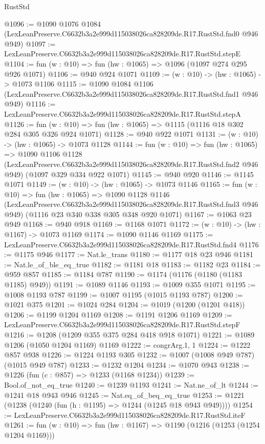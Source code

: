 \begin{lexlean}{RustStd}
\begin{coremodule}
@1096 := @1090
    @1076
    @1084
    (LexLeanPreserve.C6632b3a2e999d115038026ca828209de.R17.RustStd.fnd0 @946 @949)
@1097 := LexLeanPreserve.C6632b3a2e999d115038026ca828209de.R17.RustStd.stepE
@1104 := fun (w : @10) => fun (hw : @1065) => @1096 (@1097 @274 @295 @926 @1071)
@1106 := @940 @924 @1071
@1109 := (w : @10) -> (hw : @1065) -> @1073 @1106
@1115 := @1090
    @1084
    @1106
    (LexLeanPreserve.C6632b3a2e999d115038026ca828209de.R17.RustStd.fnd1 @946 @949)
@1116 := LexLeanPreserve.C6632b3a2e999d115038026ca828209de.R17.RustStd.stepA
@1126 := fun (w : @10) => fun (hw : @1065) => @1115 (@1116 @18 @302 @284 @305 @326 @924 @1071)
@1128 := @940 @922 @1071
@1131 := (w : @10) -> (hw : @1065) -> @1073 @1128
@1144 := fun (w : @10) =>
  fun (hw : @1065) =>
  @1090
    @1106
    @1128
    (LexLeanPreserve.C6632b3a2e999d115038026ca828209de.R17.RustStd.fnd2 @946 @949)
    (@1097 @329 @334 @922 @1071)
@1145 := @940 @920
@1146 := @1145 @1071
@1149 := (w : @10) -> (hw : @1065) -> @1073 @1146
@1165 := fun (w : @10) =>
  fun (hw : @1065) =>
  @1090
    @1128
    @1146
    (LexLeanPreserve.C6632b3a2e999d115038026ca828209de.R17.RustStd.fnd3 @946 @949)
    (@1116 @23 @340 @338 @305 @348 @920 @1071)
@1167 := @1063 @23 @949
@1168 := @940 @918
@1169 := @1168 @1071
@1172 := (w : @10) -> (hw : @1167) -> @1073 @1169
@1174 := @1090 @1146 @1169
@1175 := LexLeanPreserve.C6632b3a2e999d115038026ca828209de.R17.RustStd.fnd4
@1176 := @1175 @946
@1177 := Nat.le_trans
@1180 := @1177 @18 @23 @946
@1181 := Nat.le_of_ble_eq_true
@1182 := @1181 @18
@1183 := @1182 @23
@1184 := @959 @857
@1185 := @1184 @787
@1190 := @1174 (@1176 (@1180 (@1183 @1185) @949))
@1191 := @1089 @1146
@1193 := @1009 @355 @1071
@1195 := @1008 @1193 @787
@1199 := @1007 @1195 (@1015 @1193 @787)
@1200 := @1021 @375
@1201 := @1024 @284
@1204 := @1019 (@1200 (@1201 @418))
@1206 := @1199 @1204 @1169
@1208 := @1191 @1206 @1169
@1209 := LexLeanPreserve.C6632b3a2e999d115038026ca828209de.R17.RustStd.stepF
@1216 := @1208 (@1209 @355 @375 @284 @418 @918 @1071)
@1221 := @1089 @1206 (@1050 @1204 @1169) @1169
@1222 := congrArg.{1, 1}
@1224 := @1222 @857 @938
@1226 := @1224 @1193 @305
@1232 := @1007 (@1008 @949 @787) (@1015 @949 @787)
@1233 := @1232 @1204
@1234 := @1070 @943
@1238 := @1226 (fun (c : @857) => @1233 (@1168 @1234))
@1239 := Bool.of_not_eq_true
@1240 := @1239 @1193
@1241 := Nat.ne_of_lt
@1244 := @1241 @18 @943 @946
@1245 := Nat.eq_of_beq_eq_true
@1253 := @1221 (@1238 (@1240 (fun (h : @1195) => @1244 (@1245 @18 @943 @949))))
@1254 := LexLeanPreserve.C6632b3a2e999d115038026ca828209de.R17.RustStd.iteF
@1261 := fun (w : @10) => fun (hw : @1167) => @1190 (@1216 (@1253 (@1254 @1204 @1169)))

\end{coremodule}
\end{lexlean}
